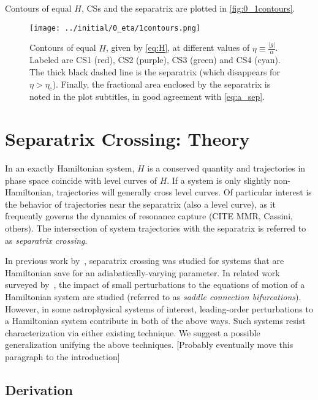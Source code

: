 \documentclass[
        fleqn,
        usenatbib,
    ]{mnras}
\newcommand*{\abs}[1]{\left|#1\right|}
\begin{document}
Contours of equal $H$, CSs and the separatrix are plotted in
\autoref{fig:0_1contours}.
\begin{figure}
    \centering
    \texttt{[image: ../initial/0\_eta/1contours.png]}
    \caption{Contours of equal $H$, given by \autoref{eq:H}, at different values
    of $\eta \equiv \frac{\abs{g}}{\alpha}$. Labeled are CS1 (red), CS2
    (purple), CS3 (green) and CS4 (cyan). The thick black dashed line is the
    separatrix (which disappears for $\eta > \eta_c$). Finally, the fractional
    area enclosed by the separatrix is noted in the plot subtitles, in good
    agreement with \autoref{eq:a_sep}.}\label{fig:0_1contours}
\end{figure}

\section{Separatrix Crossing: Theory}\label{s:sep_cross}

In an exactly Hamiltonian system, $H$ is a conserved quantity and trajectories
in phase space coincide with level curves of $H$. If a system is only slightly
non-Hamiltonian, trajectories will generally cross level curves. Of particular
interest is the behavior of trajectories near the separatrix (also a level
curve), as it frequently governs the dynamics of resonance capture (CITE MMR,
Cassini, others). The intersection of system trajectories with the separatrix is
referred to as \emph{separatrix crossing}.

In previous work by~\cite{henrard1982}, separatrix crossing was studied for systems
that are Hamiltonian save for an adiabatically-varying parameter. In related work
surveyed by~\cite{g_and_h}, the impact of small perturbations to the equations
of motion of a Hamiltonian system are studied (referred to as \emph{saddle
connection bifurcations}). However, in some astrophysical systems of interest,
leading-order perturbations to a Hamiltonian system contribute in both of the
above ways. Such systems resist characterization via either existing technique.
We suggest a possible generalization unifying the above techniques. [Probably
eventually move this paragraph to the introduction]

\subsection{Derivation}\label{ss:henrard}
\end{document}

